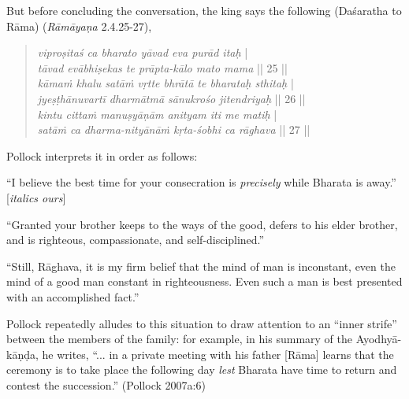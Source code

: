 But before concluding the conversation, the king says the following (Daśaratha to Rāma) ({\sl Rāmāyaṇa} 2.4.25-27), 
\begin{quote}
{{\sl viproṣitaś ca bharato yāvad eva purād itaḥ}} |\\
{{\sl tāvad evābhiṣekas te prāpta-kālo mato mama}} || 25 ||\\
{\sl kāmaṁ khalu satāṁ vṛtte bhrātā te bharataḥ sthitaḥ} |\\
{\sl jyeṣṭhānuvartī dharmātmā sānukrośo jitendriyaḥ} || 26 ||\\
{\sl kintu cittaṁ manuṣyāṇām anityam iti me matiḥ} |\\
{\sl satāṁ ca dharma-nityānāṁ kṛta-śobhi ca rāghava} || 27 ||
\end{quote}

Pollock interprets it in order as follows:

\begin{myquote}
“I believe the best time for your consecration is {\sl precisely} while Bharata is away.” [{\sl italics ours}]
								 	 
“Granted your brother keeps to the ways of the good, defers to his elder brother, and is righteous, compassionate, and self-disciplined.”
		 
“Still, Rāghava, it is my firm belief that the mind of man is inconstant, even the mind of a good man constant in righteousness. Even such a man is best presented with an accomplished fact.”	
\end{myquote}

Pollock repeatedly alludes to this situation to draw attention to an “inner strife”
 between the members of the family: for example, in his summary of the Ayodhyā-kāṇḍa, he writes, “... in a private meeting with his father [Rāma] learns that the ceremony is to take place the following day {\sl lest} Bharata have time to return and contest the succession.” (Pollock 2007a:6)

